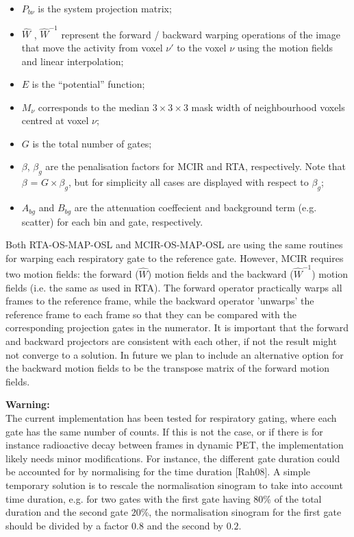 \documentclass{article}
\begin{document}
{\begin{itemize}
\item $P_{b\nu}$ is the system projection matrix;

\item $\hat{W}$ , $\hat{W}^{-1}$ represent the forward / backward warping operations of the image that move the activity from voxel $\nu'$ to the voxel $\nu$ using the motion fields and linear interpolation;

\item $E$ is the ``potential'' function;

\item $M_{\nu}$ corresponds to the median $3\times3\times3$ mask width of neighbourhood voxels centred at voxel $\nu$;

\item $G$ is the total number of gates;

\item $\beta$, $\beta_{g}$ are the penalisation factors for MCIR and RTA, respectively. Note that $\beta$ = $G\times\beta_{g}$, but for simplicity all cases are displayed with respect to $\beta_{g}$;

\item $A_{bg}$ and $B_{bg}$ are the attenuation coeffecient and background term (e.g. scatter) for each bin and gate, respectively.
\end{itemize}

Both RTA-OS-MAP-OSL and MCIR-OS-MAP-OSL are using the same routines for warping each respiratory gate to
the reference gate. However, MCIR requires two motion fields: the forward ($\hat{W}$) motion fields and the
backward ($\hat{W}^{-1}$) motion fields (i.e. the same as used in RTA). The forward operator practically warps all
frames to the reference frame, while the backward operator 'unwarps' the reference frame to each frame so
that they can be compared with the corresponding projection gates in the numerator. It is important that
the forward and backward projectors are consistent with each other, if not the result might not converge
to a solution. In future we plan to include an alternative option for the backward motion fields to be
the transpose matrix of the forward motion fields.

\noindent \textbf{Warning:}\\
The current implementation has been tested for respiratory gating, where each gate has the same number of
counts. If this is not the case, or if there is for instance radioactive decay between frames in dynamic
PET, the implementation likely needs minor modifications. For instance, the different gate duration could
be accounted for by normalising for the time duration [Rah08].
A simple temporary solution is to rescale the
normalisation sinogram to take into account time duration, e.g. for two
gates with the first gate having $80$\% of the total duration and the second
gate $20$\%, the normalisation sinogram for the first gate should be divided
by a factor $0.8$ and the second by $0.2$.



}
\end{document}
